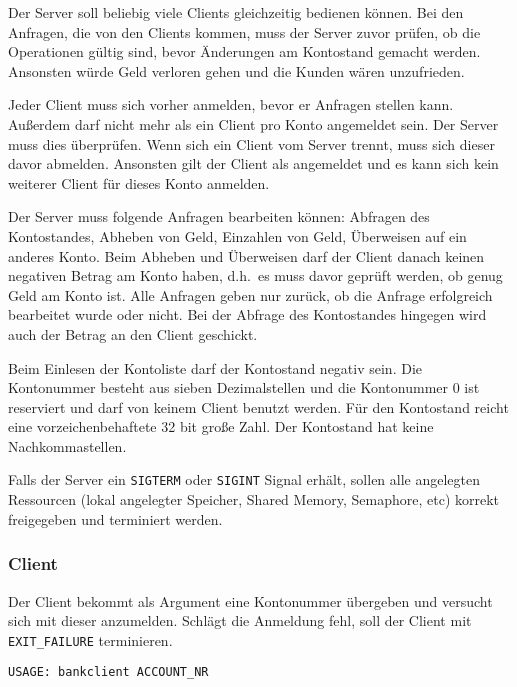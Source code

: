Der Server soll beliebig viele Clients gleichzeitig bedienen können. Bei den
Anfragen, die von den Clients kommen, muss der Server zuvor prüfen, ob die
Operationen gültig sind, bevor Änderungen am Kontostand gemacht werden.
Ansonsten würde Geld verloren gehen und die Kunden wären unzufrieden.

Jeder Client muss sich vorher anmelden, bevor er Anfragen stellen kann.
Außerdem darf nicht mehr als ein Client pro Konto angemeldet sein. Der Server
muss dies überprüfen. Wenn sich ein Client vom Server trennt, muss sich dieser
davor abmelden. Ansonsten gilt der Client als angemeldet und es kann sich kein
weiterer Client für dieses Konto anmelden.

Der Server muss folgende Anfragen bearbeiten können: Abfragen des Kontostandes,
Abheben von Geld, Einzahlen von Geld, Überweisen auf ein anderes Konto. Beim
Abheben und Überweisen darf der Client danach keinen negativen Betrag am Konto
haben, d.h.\ es muss davor geprüft werden, ob genug Geld am Konto ist. Alle
Anfragen geben nur zurück, ob die Anfrage erfolgreich bearbeitet wurde oder
nicht. Bei der Abfrage des Kontostandes hingegen wird auch der Betrag an den
Client geschickt.

Beim Einlesen der Kontoliste darf der Kontostand negativ sein. Die Kontonummer
besteht aus sieben Dezimalstellen und die Kontonummer 0 ist reserviert und darf
von keinem Client benutzt werden. Für den Kontostand reicht eine
vorzeichenbehaftete 32 bit große Zahl.
Der Kontostand hat keine Nachkommastellen.

Falls der Server ein \verb|SIGTERM| oder \verb|SIGINT| Signal erhält, sollen
alle angelegten Ressourcen (lokal angelegter Speicher, Shared Memory,
Semaphore, etc) korrekt freigegeben und terminiert werden.


\subsubsection*{Client}

Der Client bekommt als Argument eine Kontonummer übergeben und versucht sich
mit dieser anzumelden. Schlägt die Anmeldung fehl, soll der Client mit
\verb|EXIT_FAILURE| terminieren.

\begin{verbatim}
USAGE: bankclient ACCOUNT_NR
\end{verbatim}

